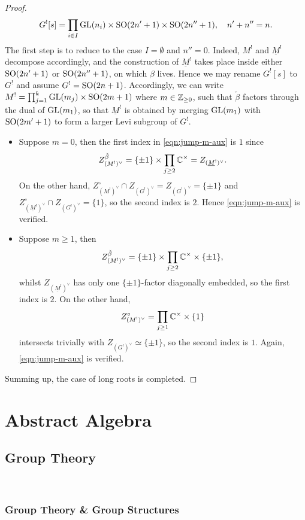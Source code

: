 \documentclass[12pt, a3paper, openany]{book}
\begin{document}
\begin{proof}
	\[ G^![s] = \prod_{i \in I} \operatorname{GL}(n_i) \times \operatorname{SO}(2n'+1) \times \operatorname{SO}(2n''+1), \quad n' + n'' = n. \]
	The first step is to reduce to the case $I = \emptyset$ and $n'' = 0$. Indeed, $M^!$ and $\underline{M}^!$ decompose accordingly, and the construction of $\underline{M}^!$ takes place inside either $\operatorname{SO}(2n'+1)$ or $\operatorname{SO}(2n''+1)$, on which $\beta$ lives. Hence we may rename $G^![s]$ to $G^!$ and assume $G^! = \operatorname{SO}(2n+1)$.
	Accordingly, we can write $M^! = \prod_{j=1}^k \operatorname{GL}(m_j) \times \operatorname{SO}(2m+1)$ where $m \in \mathbb{Z}_{\geq 0}$, such that $\check{\beta}$ factors through the dual of $\operatorname{GL}(m_1)$, so that $\underline{M}^!$ is obtained by merging $\operatorname{GL}(m_1)$ with $\operatorname{SO}(2m'+1)$ to form a larger Levi subgroup of $G^!$.
	\begin{itemize}
		\item Suppose $m=0$, then the first index in \eqref{eqn:jump-m-aux} is $1$ since
		\[ Z_{(M^!)^\vee}^{\check{\beta}} = \{\pm 1\} \times \prod_{j \geq 2} \mathbb{C}^\times = Z_{(\underline{M}^!)^\vee}. \]
		On the other hand, $Z_{(M^!)^\vee}^\circ \cap Z_{(G^!)^\vee} = Z_{(G^!)^\vee} = \{\pm 1\}$ and $Z_{(\underline{M}^!)^\vee}^\circ \cap Z_{(G^!)^\vee} = \{1\}$, so the second index is $2$. Hence \eqref{eqn:jump-m-aux} is verified.
		\item Suppose $m \geq 1$, then
		\[ Z_{(M^!)^\vee}^{\check{\beta}} = \{\pm 1\} \times \prod_{j \geq 2} \mathbb{C}^\times \times \{\pm 1\} ,\]
		whilst $Z_{(\underline{M}^!)^\vee}$ has only one $\{\pm 1\}$-factor diagonally embedded, so the first index is $2$. On the other hand,
		\[ Z_{(M^!)^\vee}^\circ = \prod_{j \geq 1} \mathbb{C}^\times \times \{1\} \]
		intersects trivially with $Z_{(G^!)^\vee} \simeq \{\pm 1\}$, so the second index is $1$. Again, \eqref{eqn:jump-m-aux} is verified.
	\end{itemize}
	Summing up, the case of long roots is completed.
\end{proof}
\part{Abstract Algebra}
\chapter{Group Theory}
\\
\headrule
\startcontents
{}
\section{Group Theory \& Group Structures}
\end{document}
